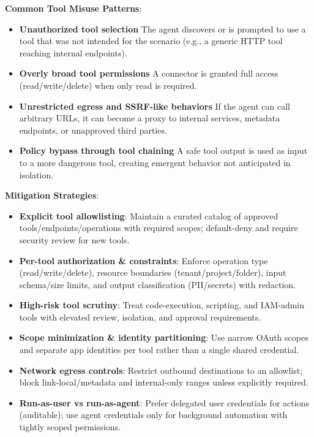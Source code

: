 \begin{TNtwocol}
    \textbf{Common Tool Misuse Patterns}:
    \begin{itemize}
        \item \textbf{Unauthorized tool selection} The agent discovers or is prompted to use a tool that was not intended for the scenario (e.g., a generic HTTP tool reaching internal endpoints).
        \item \textbf{Overly broad tool permissions} A connector is granted full access (read/write/delete) when only read is required.
        \item \textbf{Unrestricted egress and SSRF-like behaviors} If the agent can call arbitrary URLs, it can become a proxy to internal services, metadata endpoints, or unapproved third parties.
        \item \textbf{Policy bypass through tool chaining} A safe tool output is used as input to a more dangerous tool, creating emergent behavior not anticipated in isolation.
    \end{itemize}

    \textbf{Mitigation Strategies}:
    \begin{itemize}
        \item \textbf{Explicit tool allowlisting}: Maintain a curated catalog of approved tools/endpoints/operations with required scopes; default-deny and require security review for new tools.
        \item \textbf{Per-tool authorization \& constraints}: Enforce operation type (read/write/delete), resource boundaries (tenant/project/folder), input schema/size limits, and output classification (PII/secrets) with redaction.
        \item \textbf{High-risk tool scrutiny}: Treat code-execution, scripting, and IAM-admin tools with elevated review, isolation, and approval requirements.
        \item \textbf{Scope minimization \& identity partitioning}: Use narrow OAuth scopes and separate app identities per tool rather than a single shared credential.
        \item \textbf{Network egress controls}: Restrict outbound destinations to an allowlist; block link-local/metadata and internal-only ranges unless explicitly required.
        \item \textbf{Run-as-user vs run-as-agent}: Prefer delegated user credentials for actions (auditable); use agent credentials only for background automation with tightly scoped permissions.
    \end{itemize}


\end{TNtwocol}
